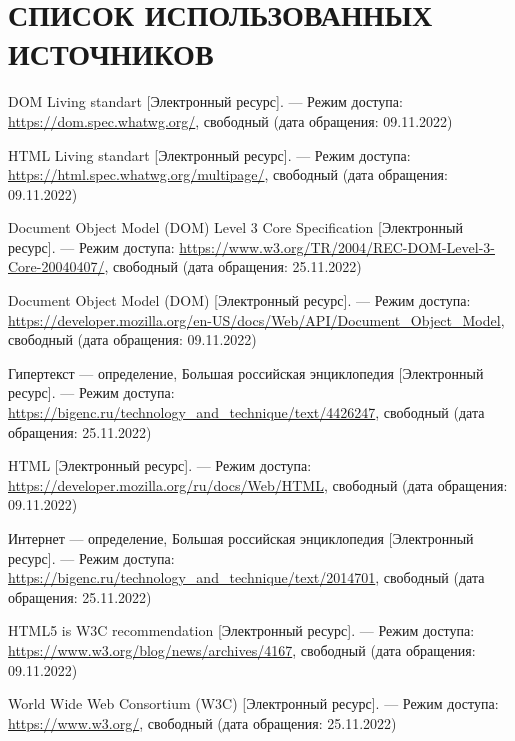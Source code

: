 \section*{СПИСОК ИСПОЛЬЗОВАННЫХ ИСТОЧНИКОВ}

\begingroup
\renewcommand{\section}[2]{}
\begin{thebibliography}{}
	
	DOM Living standart [Электронный ресурс]. --- Режим доступа: \url{https://dom.spec.whatwg.org/}, свободный (дата обращения: 09.11.2022)
	
	HTML Living standart [Электронный ресурс]. --- Режим доступа: \url{https://html.spec.whatwg.org/multipage/}, свободный (дата обращения: 09.11.2022)
	
	Document Object Model (DOM) Level 3 Core Specification [Электронный ресурс]. --- Режим доступа: \url{https://www.w3.org/TR/2004/REC-DOM-Level-3-Core-20040407/}, свободный (дата обращения: 25.11.2022)
	
	Document Object Model (DOM) [Электронный ресурс]. --- Режим доступа: \url{https://developer.mozilla.org/en-US/docs/Web/API/Document_Object_Model}, свободный (дата обращения: 09.11.2022)
	
	Гипертекст --- определение, Большая российская энциклопедия [Электронный ресурс]. --- Режим доступа: \url{https://bigenc.ru/technology_and_technique/text/4426247}, свободный (дата обращения: 25.11.2022)
	
	HTML [Электронный ресурс]. --- Режим доступа: \url{https://developer.mozilla.org/ru/docs/Web/HTML}, свободный (дата обращения: 09.11.2022)
	
	Интернет --- определение, Большая российская энциклопедия [Электронный ресурс]. --- Режим доступа: \url{https://bigenc.ru/technology_and_technique/text/2014701}, свободный (дата обращения: 25.11.2022)
	
	HTML5 is W3C recommendation [Электронный ресурс]. --- Режим доступа: \url{https://www.w3.org/blog/news/archives/4167}, свободный (дата обращения: 09.11.2022)
	
	World  Wide Web Consortium (W3C) [Электронный ресурс]. --- Режим доступа: \url{https://www.w3.org/}, свободный (дата обращения: 25.11.2022)
	

\end{thebibliography}
